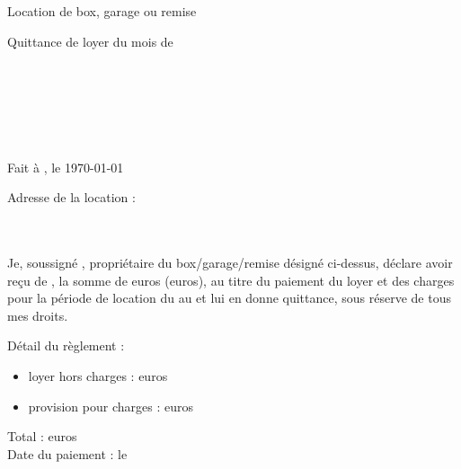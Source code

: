 \documentclass[12pt,a4paper]{article}
\begin{document}
\thispagestyle{empty}

\begin{center}
Location de box, garage ou remise\\
\begin{LARGE}
Quittance de loyer du mois de \nommois\space\annee
\end{LARGE}
\end{center}
\bigskip

\begin{flushleft}
\nomproprio\\
\adresseproprio\\
\villeproprio
\end{flushleft}

\medskip

\begin{flushright}
\nomlocataire\\
\adresselocataire\\
\villelocataire
\end{flushright}

\medskip

\begin{flushright}
Fait à \lieudocument, le \today
\end{flushright}

\medskip

\begin{flushleft}
Adresse de la location :\\
\adresselocation\\
\lotlocation\\
\villelocation
\end{flushleft}

\medskip

\begin{flushleft}
\-\hspace{0.5cm}Je, soussigné \nomproprio, propriétaire du box/garage/remise désigné ci-dessus, déclare avoir reçu de \nomlocataire, la somme de \montantrecuchiffres\space euros (\montantreculettres\space euros), au titre du paiement du loyer et des charges pour la période de location du \debutmois\space au \finmois\space et lui en donne quittance, sous réserve de tous mes droits.
\end{flushleft}

\medskip

\begin{flushleft}
Détail du règlement :\\
\begin{itemize}
\item loyer hors charges : \loyerchiffres\space euros\\
\item provision pour charges : \charges\space euros\\
\end{itemize}
Total : \loyerccchiffres\space euros\\
Date du paiement : le \datepaiement
\end{flushleft}
\end{document}
